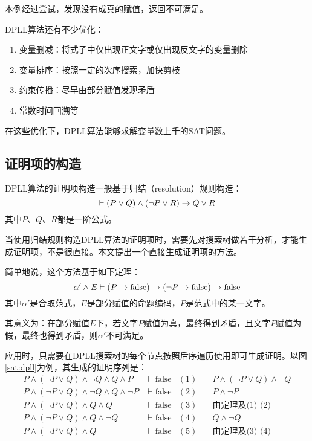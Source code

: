 本例经过尝试，发现没有成真的赋值，返回不可满足。

DPLL算法还有不少优化：
\begin{enumerate}
  \item 变量删减：将式子中仅出现正文字或仅出现反文字的变量删除
  \item 变量排序：按照一定的次序搜索，加快剪枝
  \item 约束传播：尽早由部分赋值发现矛盾
  \item 常数时间回溯等
\end{enumerate}
在这些优化下，DPLL算法能够求解变量数上千的SAT问题。

\subsection{证明项的构造}
DPLL算法的证明项构造一般基于归结（resolution）规则构造：
$$\vdash (P \lor Q) \land (\lnot P \lor R) \rightarrow Q \lor R$$
其中$P$、$Q$、$R$都是一阶公式。

当使用归结规则构造DPLL算法的证明项时，需要先对搜索树做若干分析，才能生成证明项，不是很直接。本文提出一个直接生成证明项的方法。

简单地说，这个方法基于如下定理：
$$\alpha' \land E \vdash (P \rightarrow \mathrm{false}) \rightarrow (\lnot P \rightarrow \mathrm{false}) \rightarrow \mathrm{false} $$
其中$\alpha'$是合取范式，$E$是部分赋值的命题编码，$P$是范式中的某一文字。

其意义为：在部分赋值$E$下，若文字$P$赋值为真，最终得到矛盾，且文字$P$赋值为假，最终也得到矛盾，则$\alpha'$不可满足。

应用时，只需要在DPLL搜索树的每个节点按照后序遍历使用即可生成证明。以图\ref{sat:dpll}为例，其生成的证明序列是：
\begin{align*}
  P \land (\lnot P \lor Q) \land \lnot Q \land Q \land P & \vdash \mathrm{false} & (1) & \quad P \land (\lnot P \lor Q) \land \lnot Q \\
  P \land (\lnot P \lor Q) \land \lnot Q \land Q \land \lnot P & \vdash \mathrm{false} & (2) & \quad P \land \lnot P \\
  P \land (\lnot P \lor Q) \land Q \land Q  & \vdash \mathrm{false} & (3) & \quad \text{由定理及(1) (2)}\\
  P \land (\lnot P \lor Q) \land Q \land \lnot Q & \vdash \mathrm{false} & (4) & \quad Q \land \lnot Q \\
  P \land (\lnot P \lor Q) \land Q & \vdash \mathrm{false} & (5) & \quad \text{由定理及(3) (4)}
\end{align*}


